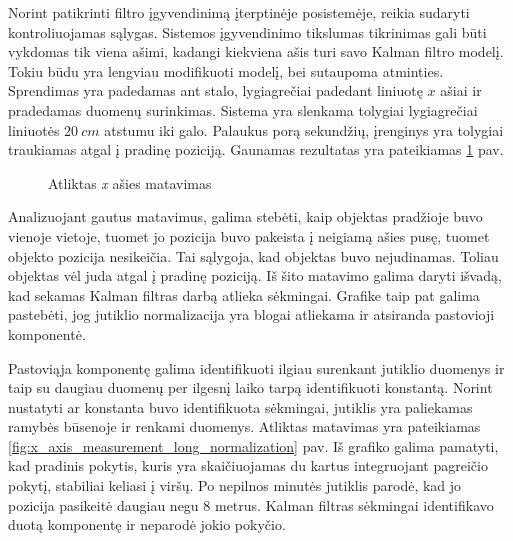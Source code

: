 Norint patikrinti filtro įgyvendinimą įterptinėje posistemėje, reikia sudaryti kontroliuojamas sąlygas.
Sistemos įgyvendinimo tikslumas tikrinimas gali būti vykdomas tik viena ašimi, kadangi kiekviena ašis turi savo Kalman filtro modelį.
Tokiu būdu yra lengviau modifikuoti modelį, bei sutaupoma atminties.
Sprendimas yra padedamas ant stalo, lygiagrečiai padedant liniuotę $x$ ašiai ir pradedamas duomenų surinkimas.
Sistema yra slenkama tolygiai lygiagrečiai liniuotės $20~cm$ atstumu iki galo.
Palaukus porą sekundžių, įrenginys yra tolygiai traukiamas atgal į pradinę poziciją.
Gaunamas rezultatas yra pateikiamas \ref{fig:x_axis_measurement} pav.

\begin{figure}[b]
    \centering
    \caption{Atliktas \textit{x} ašies matavimas}
    \label{fig:x_axis_measurement}
\end{figure}

Analizuojant gautus matavimus, galima stebėti, kaip objektas pradžioje buvo vienoje vietoje, tuomet jo pozicija buvo pakeista į neigiamą ašies pusę, tuomet objekto pozicija nesikeičia.
Tai sąlygoja, kad objektas buvo nejudinamas.
Toliau objektas vėl juda atgal į pradinę poziciją.
Iš šito matavimo galima daryti išvadą, kad sekamas Kalman filtras darbą atlieka sėkmingai.
Grafike taip pat galima pastebėti, jog jutiklio normalizacija yra blogai atliekama ir atsiranda pastovioji komponentė.

Pastoviąja komponentę galima identifikuoti ilgiau surenkant jutiklio duomenys ir taip su daugiau duomenų per ilgesnį laiko tarpą identifikuoti konstantą.
Norint nustatyti ar konstanta buvo identifikuota sėkmingai, jutiklis yra paliekamas ramybės būsenoje ir renkami duomenys.
Atliktas matavimas yra pateikiamas \ref{fig:x_axis_measurement_long_normalization} pav.
Iš grafiko galima pamatyti, kad pradinis pokytis, kuris yra skaičiuojamas du kartus integruojant pagreičio pokytį, stabiliai keliasi į viršų.
Po nepilnos minutės jutiklis parodė, kad jo pozicija pasikeitė daugiau negu 8 metrus.
Kalman filtras sėkmingai identifikavo duotą komponentę ir neparodė jokio pokyčio.

